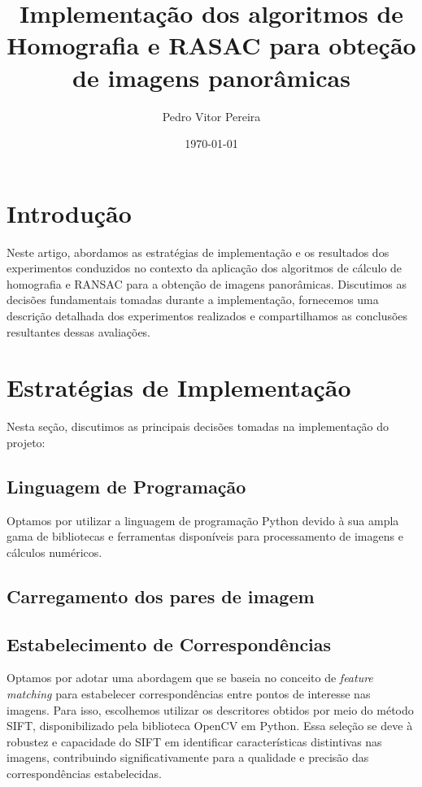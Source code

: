 \documentclass{article}
\title{Implementação dos algoritmos de Homografia e RASAC para obteção de imagens panorâmicas}
\author{Pedro Vitor Pereira}
\date{\today}
\begin{document}
\maketitle

\section{Introdução}

Neste artigo, abordamos as estratégias de implementação e os resultados dos experimentos conduzidos no contexto da aplicação dos algoritmos de cálculo de homografia e RANSAC para a obtenção de imagens panorâmicas. Discutimos as decisões fundamentais tomadas durante a implementação, fornecemos uma descrição detalhada dos experimentos realizados e compartilhamos as conclusões resultantes dessas avaliações.

\section{Estratégias de Implementação}

Nesta seção, discutimos as principais decisões tomadas na implementação do projeto:

\subsection{Linguagem de Programação}

Optamos por utilizar a linguagem de programação Python devido à sua ampla gama de bibliotecas e ferramentas disponíveis para processamento de imagens e cálculos numéricos.

\subsection{Carregamento dos pares de imagem}




\subsection{Estabelecimento de Correspondências}

Optamos por adotar uma abordagem que se baseia no conceito de \textit{feature matching} para estabelecer correspondências entre pontos de interesse nas imagens. Para isso, escolhemos utilizar os descritores obtidos por meio do método SIFT, disponibilizado pela biblioteca OpenCV em Python. Essa seleção se deve à robustez e capacidade do SIFT em identificar características distintivas nas imagens, contribuindo significativamente para a qualidade e precisão das correspondências estabelecidas.
\end{document}
